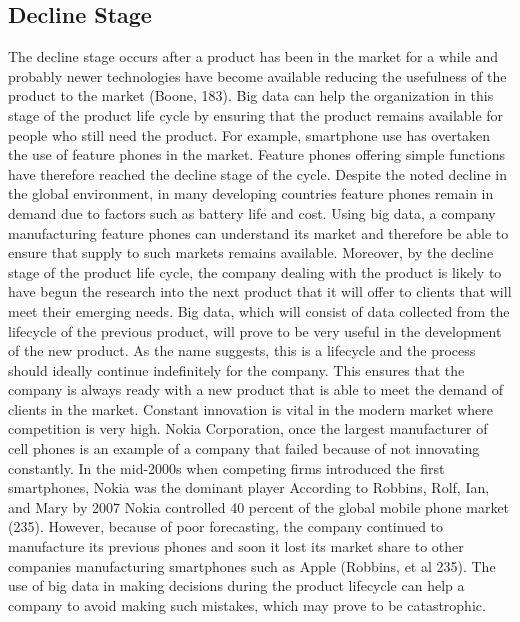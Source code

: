 \documentclass[sigconf]{acmart}
\begin{document}
\subsection{Decline Stage}
The decline stage occurs after a product has been in the market for a while and probably newer technologies have become available reducing the usefulness of the product to the market (Boone, 183). Big data can help the organization in this stage of the product life cycle by ensuring that the product remains available for people who still need the product. For example, smartphone use has overtaken the use of feature phones in the market. Feature phones offering simple functions have therefore reached the decline stage of the cycle. Despite the noted decline in the global environment, in many developing countries feature phones remain in demand due to factors such as battery life and cost. Using big data, a company manufacturing feature phones can understand its market and therefore be able to ensure that supply to such markets remains available. 
Moreover, by the decline stage of the product life cycle, the company dealing with the product is likely to have begun the research into the next product that it will offer to clients that will meet their emerging needs. Big data, which will consist of data collected from the lifecycle of the previous product, will prove to be very useful in the development of the new product. As the name suggests, this is a lifecycle and the process should ideally continue indefinitely for the company. This ensures that the company is always ready with a new product that is able to meet the demand of clients in the market. 
Constant innovation is vital in the modern market where competition is very high. Nokia Corporation, once the largest manufacturer of cell phones is an example of a company that failed because of not innovating constantly. In the mid-2000s when competing firms introduced the first smartphones, Nokia was the dominant player According to Robbins, Rolf, Ian, and Mary by 2007 Nokia controlled 40 percent of the global mobile phone market (235). However, because of poor forecasting, the company continued to manufacture its previous phones and soon it lost its market share to other companies manufacturing smartphones such as Apple (Robbins, et al 235). The use of big data in making decisions during the product lifecycle can help a company to avoid making such mistakes, which may prove to be catastrophic. 
\end{document}
